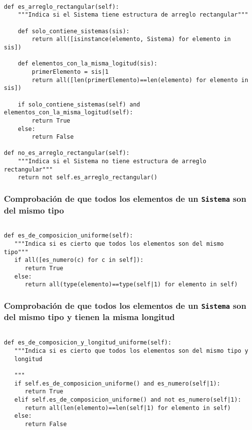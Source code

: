 \documentclass[11pt]{report}
\begin{document}
\begin{verbatim}

def es_arreglo_rectangular(self):
    """Indica si el Sistema tiene estructura de arreglo rectangular"""

    def solo_contiene_sistemas(sis):
        return all([isinstance(elemento, Sistema) for elemento in sis])

    def elementos_con_la_misma_logitud(sis):
        primerElemento = sis|1
        return all([len(primerElemento)==len(elemento) for elemento in sis])

    if solo_contiene_sistemas(self) and elementos_con_la_misma_logitud(self):
        return True
    else:
        return False

def no_es_arreglo_rectangular(self):
    """Indica si el Sistema no tiene estructura de arreglo rectangular"""
    return not self.es_arreglo_rectangular()

\end{verbatim}

\subsubsection{Comprobación de que todos los elementos de un \texttt{Sistema} son del mismo tipo}
\label{sec:orga95fb64}


\begin{verbatim}

def es_de_composicion_uniforme(self):
   """Indica si es cierto que todos los elementos son del mismo tipo"""
   if all([es_numero(c) for c in self]):
      return True
   else:
      return all(type(elemento)==type(self|1) for elemento in self)

\end{verbatim}

\subsubsection{Comprobación de que todos los elementos de un \texttt{Sistema} son del mismo tipo y tienen la misma longitud}
\label{sec:org7df0590}


\begin{verbatim}

def es_de_composicion_y_longitud_uniforme(self):
   """Indica si es cierto que todos los elementos son del mismo tipo y
   longitud

   """
   if self.es_de_composicion_uniforme() and es_numero(self|1):
      return True   
   elif self.es_de_composicion_uniforme() and not es_numero(self|1):
      return all(len(elemento)==len(self|1) for elemento in self)
   else:
      return False
   
\end{verbatim}
\end{document}
